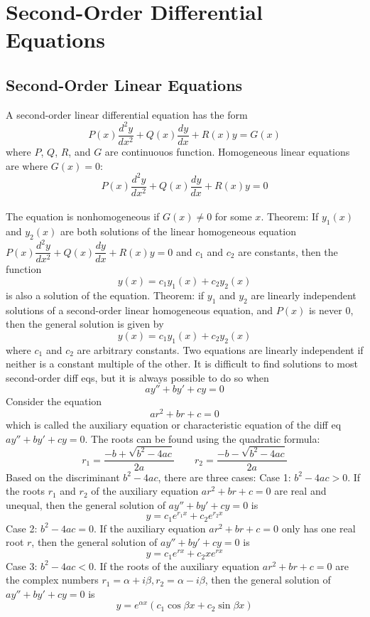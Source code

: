 \documentclass{article}
\begin{document}
    \section{Second-Order Differential Equations} %
    \begin{multicols}{2}

    \subsection{Second-Order Linear Equations}
    \begin{outline}
        \1 A second-order linear differential equation has the form \[P(x)\dfrac{d^2y}{dx^2}+Q(x)\dfrac{dy}{dx}+R(x)y=G(x)\] where \(P\), \(Q\), \(R\), and \(G\) are continuouos function. 
        \1 Homogeneous linear equations are where \(G(x)=0\): \[P(x)\dfrac{d^2y}{dx^2}+Q(x)\dfrac{dy}{dx}+R(x)y=0\] \\The equation is nonhomogeneous if \(G(x)\neq 0\) for some $x$. 
        \1 Theorem: If \(y_1(x)\) and \(y_2(x)\) are both solutions of the linear homogeneous equation \(P(x)\dfrac{d^2y}{dx^2}+Q(x)\dfrac{dy}{dx}+R(x)y=0\) and \(c_1\) and \(c_2\) are constants, then the function \[y(x)=c_1y_1(x)+c_2y_2(x)\] is also a solution of the equation. 
        \1 Theorem: if \(y_1\) and \(y_2\) are linearly independent solutions of a second-order linear homogeneous equation, and \(P(x)\) is never \(0\), then the general solution is given by \[y(x)=c_1y_1(x)+c_2y_2(x)\] where \(c_1\) and \(c_2\) are arbitrary constants. 
        \1 Two equations are linearly independent if neither is a constant multiple of the other. 
        \1 It is difficult to find solutions to most second-order diff eqs, but it is always possible to do so when \[ay''+by'+cy=0\]
        \1 Consider the equation \[ar^2+br+c=0\] which is called the auxiliary equation or characteristic equation of the diff eq \(ay''+by'+cy=0\). The roots can be found using the quadratic formula: \[r_1=\dfrac{-b+\sqrt{b^2-4ac}}{2a}\qquad r_2=\dfrac{-b-\sqrt{b^2-4ac}}{2a}\]
        \1 Based on the discriminant \(b^2-4ac\), there are three cases: 
            \2 Case 1: \(b^2-4ac>0\). If the roots $r_1$ and $r_2$ of the auxiliary equation \(ar^2+br+c=0\) are real and unequal, then the general solution of \(ay''+by'+cy=0\) is \[y=c_1e^{r_1x}+c_2e^{r_2x}\]
            \2 Case 2: \(b^2-4ac=0\). If the auxiliary equation \(ar^2+br+c=0\) only has one real root $r$, then the general solution of \(ay''+by'+cy=0\) is \[y=c_1e^{rx}+c_2xe^{rx}\]
            \2 Case 3: \(b^2-4ac<0\). If the roots of the auxiliary equation \(ar^2+br+c=0\) are the complex numbers \(r_1=\alpha+i\beta,r_2=\alpha-i\beta\), then the general solution of \(ay''+by'+cy=0\) is \[y=e^{\alpha x}(c_1\cos\beta x+c_2\sin\beta x)\]
    \end{outline}

\end{multicols}
\end{document}
